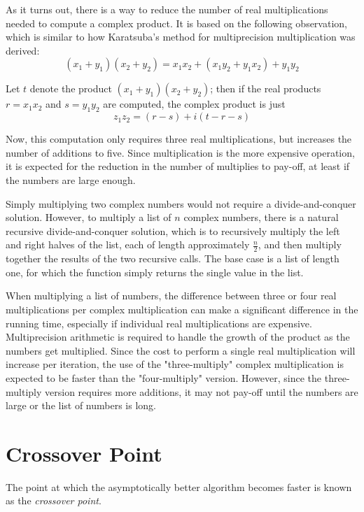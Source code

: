 \documentclass[usletter, 12pt]{article}
\begin{document}
        As it turns out, there is a way to reduce the number of real multiplications needed to compute a complex product. It is based on the following observation, which is similar to how Karatsuba's method for multiprecision multiplication was derived:
            \[ (x_{1}+y_{1})(x_{2}+y_{2})=x_{1}x_{2}+(x_{1}y_{2}+y_{1}x_{2})+y_{1}y_{2} \]

        Let $t$ denote the product $(x_{1}+y_{1})(x_{2}+y_{2})$; then if the real products $r=x_{1}x_{2}$ and $s=y_{1}y_{2}$ are computed, the complex product is just
            \[ z_{1}z_{2}=(r-s)+i(t-r-s) \]

        Now, this computation only requires three real multiplications, but increases the number of additions to five. Since multiplication is the more expensive operation, it is expected for the reduction in the number of multiplies to pay-off, at least if the numbers are large enough.

        Simply multiplying two complex numbers would not require a divide-and-conquer solution. However, to multiply a list of $n$ complex numbers, there is a natural recursive divide-and-conquer solution, which is to recursively multiply the left and right halves of the list, each of length approximately $\frac{n}{2}$, and then multiply together the results of the two recursive calls. The base case is a list of length one, for which the function simply returns the single value in the list.

        When multiplying a list of numbers, the difference between three or four real multiplications per complex multiplication can make a significant difference in the running time, especially if individual real multiplications are expensive. Multiprecision arithmetic is required to handle the growth of the product as the numbers get multiplied. Since the cost to perform a single real multiplication will increase per iteration, the use of the "three-multiply" complex multiplication is expected to be faster than the "four-multiply" version. However, since the three-multiply version requires more additions, it may not pay-off until the numbers are large or the list of numbers is long.

    \section{Crossover Point}

        The point at which the asymptotically better algorithm becomes faster is known as the \textit{crossover point}.
\end{document}
